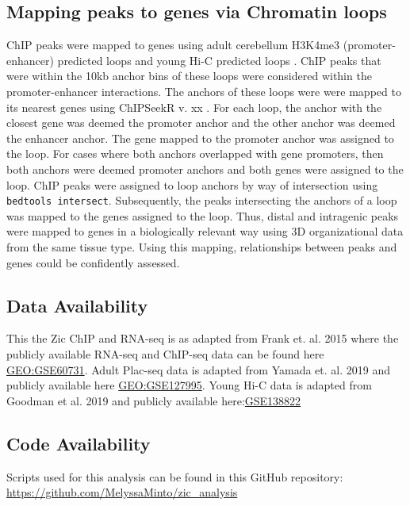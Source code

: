 \documentclass[fleqn,10pt,twocolumn]{wlscirep}
\begin{document}
\subsection*{Mapping peaks to genes via Chromatin loops}
ChIP peaks were mapped to genes using adult cerebellum H3K4me3 (promoter-enhancer) predicted loops \cite{Yamada2019SensoryLearning} and young Hi-C predicted loops \cite{Goodman2019RegulationRemodeling}. ChIP peaks that were within the 10kb anchor bins of these loops were considered within the promoter-enhancer interactions. The anchors of these loops were were mapped to its nearest genes using ChIPSeekR v. xx \cite{}. For each loop, the anchor with the closest gene was deemed the promoter anchor and the other anchor was deemed the enhancer anchor. The gene mapped to the promoter anchor was assigned to the loop. For cases where both anchors overlapped with gene promoters, then both anchors were deemed promoter anchors and both genes were assigned to the loop. ChIP peaks were assigned to loop anchors by way of intersection using \texttt{bedtools intersect}. Subsequently, the peaks intersecting the anchors of a loop was mapped to the genes assigned to the loop. Thus, distal and intragenic peaks were mapped to genes in a biologically relevant way using 3D organizational data from the same tissue type. Using this mapping, relationships between peaks and genes could be confidently assessed.  



\subsection*{Data Availability}
This the Zic ChIP and RNA-seq is as adapted from Frank et. al. 2015 \cite{Frank2015RegulationCerebellum} where the publicly available RNA-seq and ChIP-seq  data can be found here \href{https://www.ncbi.nlm.nih.gov/geo/query/acc.cgi?acc=GSE60731}{GEO:GSE60731}. Adult Plac-seq data is adapted from Yamada et. al. 2019 \cite{Yamada2019SensoryLearning} and publicly available here \href{https://www.ncbi.nlm.nih.gov/geo/query/acc.cgi?acc=GSE127995}{GEO:GSE127995}. Young Hi-C data is adapted from Goodman et al. 2019 \cite{Goodman2020TheBrain} and publicly available here:\href{https://www.ncbi.nlm.nih.gov/geo/query/acc.cgi?acc=GSE138822}{GSE138822}

\subsection*{Code Availability}
Scripts used for this analysis can be found in this GitHub repository: \href{https://github.com/MelyssaMinto/zic_analysis}{https://github.com/MelyssaMinto/zic_analysis}
\end{document}
